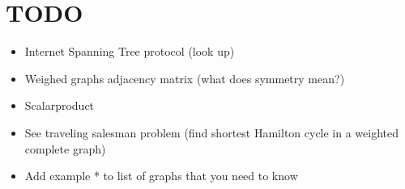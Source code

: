 \section{TODO}\par
\begin{itemize}
  \item Internet Spanning Tree protocol (look up) 
  \item Weighed graphs adjacency matrix (what does symmetry mean?)
  \item Scalarproduct
  \item See traveling salesman problem (find shortest Hamilton cycle in a weighted complete graph)
  \item Add example * to list of graphs that you need to know
\end{itemize}
